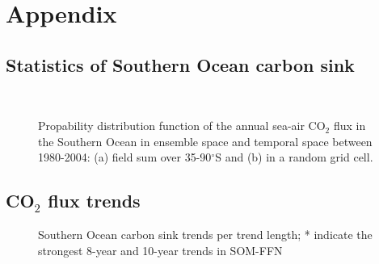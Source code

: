 \chapter{Appendix}

\renewcommand{\thefigure}{A\arabic{figure}}
\setcounter{figure}{0}
\section{Statistics of Southern Ocean carbon sink}
\begin{figure}[h!]
        \myfloatalign
        \captionsetup[subfigure]{justification=centering}
         \quad
         \\
        \caption{Propability distribution function of the annual sea-air CO$_2$ flux in the Southern Ocean in ensemble space and temporal space between 1980-2004: (a) field sum over 35-90$^\circ$S and (b) in a random grid cell.} \label{fig:SOCS_temporal_gaussian}
\end{figure}

\clearpage
\section{CO$_2$ flux trends}
\begin{figure}[h!]
\caption{Southern Ocean carbon sink trends per trend length; * indicate the strongest 8-year and 10-year trends in \ac{SOM-FFN}}
	\label{fig:heatmap}
\end{figure}

